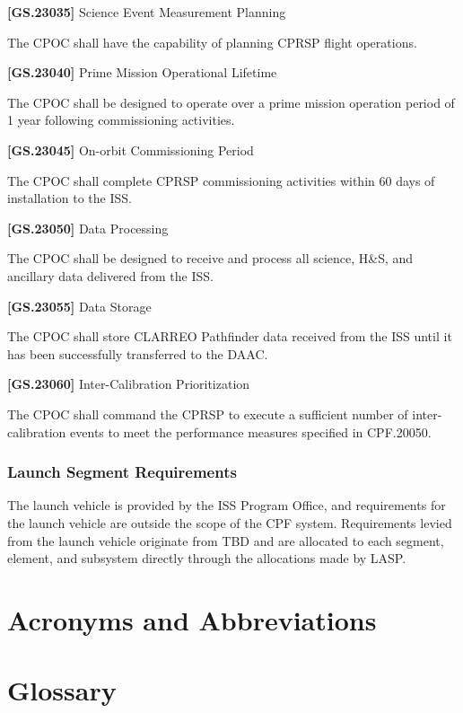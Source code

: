 \textbf{[GS.23035]} Science Event Measurement Planning

The \gls{CPOC} shall have the capability of planning \gls{CPRSP} flight operations.

\textbf{[GS.23040]} Prime Mission Operational Lifetime

The \gls{CPOC} shall be designed to operate over a prime mission operation period of 1 year following commissioning activities.

\textbf{[GS.23045]} On-orbit Commissioning Period

The \gls{CPOC} shall complete \gls{CPRSP} commissioning activities within 60 days of installation to the \gls{ISS}.

\textbf{[GS.23050]} Data Processing

The \gls{CPOC} shall be designed to receive and process all science, H\&S, and ancillary data delivered from the \gls{ISS}.

\textbf{[GS.23055]} Data Storage

The \gls{CPOC} shall store \gls{CLARREO} Pathfinder data received from the \gls{ISS} until it has been successfully transferred to the \gls{DAAC}.

\textbf{[GS.23060]} Inter-Calibration Prioritization

The \gls{CPOC} shall command the \gls{CPRSP} to execute a sufficient number of inter-calibration events to meet the performance \gls{measure}s specified in \gls{CPF}.20050.

\subsection{Launch Segment Requirements}
\label{launchsegmentrequirements}

The launch vehicle is provided by the \gls{ISS} Program Office, and requirements for the launch vehicle are outside the scope of the \gls{CPF} system. Requirements levied from the launch vehicle originate from TBD\label{tbx_2} and are allocated to each segment, element, and subsystem directly through the allocations made by \gls{LASP}.


\begin{appendices}


\chapter{Acronyms and Abbreviations  }
\label{sec_acros}

\printglossary[type=\acronymtype]

\chapter{Glossary  }
\label{sec_gls}


\renewcommand{\entryname}{Term}
\renewcommand{\descriptionname}{Definition}
\printglossary


\end{appendices}




